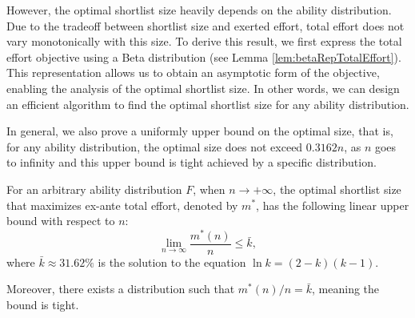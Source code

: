 
However, the optimal shortlist size heavily depends on the ability distribution. Due to the tradeoff between shortlist size and exerted effort, total effort does not vary monotonically with this size. To derive this result, we first express the total effort objective using a Beta distribution (see Lemma \ref{lem:betaRepTotalEffort}). This representation allows us to obtain an asymptotic form of the objective, enabling the analysis of the optimal shortlist size. In other words, we can design an efficient algorithm to find the optimal shortlist size for any ability distribution. 

In general, we also prove a uniformly upper bound on the optimal size, that is, for any ability distribution, the optimal size does not exceed $0.3162n$, as $n$ goes to infinity and this upper bound is tight achieved by a specific distribution.
\begin{theorem}%
    For an arbitrary ability distribution $F$, when $n\rightarrow +\infty$, the optimal shortlist size that maximizes ex-ante total effort, denoted by $m^{*}$, has the following linear upper bound with respect to $n$:
    $$ \lim_{n \rightarrow \infty} \frac{m^*(n)}{n} \leq \bar{k},$$
    where $\bar{k} \approx 31.62\%$ is the solution to the equation $\ln k=(2-k)(k-1)$.

    Moreover, there exists a distribution such that $m^*(n)/n=\bar{k}$, meaning the bound is tight. 
\end{theorem}
    
